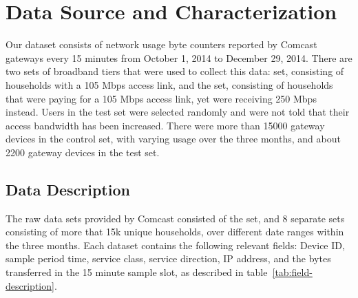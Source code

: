 \section{Data Source and Characterization}\label{sec:data}


Our dataset consists of network usage byte counters reported by Comcast gateways 
every 15 minutes from October 1, 2014 to December 29, 2014. There are two sets 
of broadband tiers that were used to collect this data: \control set, consisting 
of households with a 105 Mbps access link, and the \test set, consisting of 
households that were paying for a 105 Mbps access link, yet were receiving 250 
Mbps instead. Users in the test set were selected randomly and were not told 
that their access bandwidth has been increased. There were more than 15000 
gateway devices in the control set, with varying usage over the three months, 
and about 2200 gateway devices in the test set.


\subsection{Data Description}
\label{subsec:data-description}

The raw data sets provided by Comcast consisted of the \test set, and 8 separate 
\control sets consisting of more that 15k unique households, over different 
date ranges within the three months. Each dataset contains the following 
relevant fields: Device ID, sample period time, service class, service 
direction, IP address, and the bytes transferred in the 15 minute sample slot, 
as described in table~\ref{tab:field-description}.

